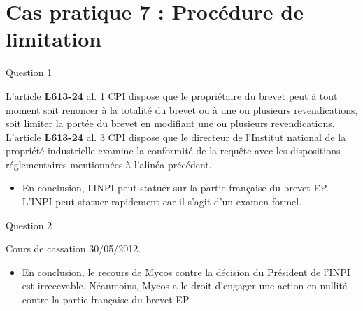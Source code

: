 
\section[Cas 7]{Cas pratique 7 : Procédure de limitation}

\begin{frame}{Question 1}

\begin{block}{}
L'article \textbf{L613-24} al. 1 CPI dispose que
le propriétaire du brevet peut à tout moment soit renoncer 
à la totalité du brevet ou à une ou plusieurs revendications, 
soit limiter la portée du brevet 
en modifiant une ou plusieurs revendications.\\
L'article \textbf{L613-24} al. 3 CPI dispose que
le directeur de l'Institut national de 
la propriété industrielle examine 
la conformité de la requête avec
 les dispositions réglementaires 
 mentionnées à l'alinéa précédent.
\end{block}

\begin{itemize}
  \item En conclusion, l'INPI peut statuer
  sur la partie française du brevet EP.
  L'INPI peut statuer rapidement car il s'agit
  d'un examen formel.
\end{itemize}

\end{frame}

\begin{frame}{Question 2}

\begin{block}{}
Cours de cassation 30/05/2012. 
\end{block}

\begin{itemize}
  \item En conclusion, le recours de Mycos
  contre la décision du Président de l'INPI
  est irrecevable. Néanmoins, Mycos a le droit
  d'engager une action en nullité contre
  la partie française du brevet EP.
\end{itemize}

\end{frame}

